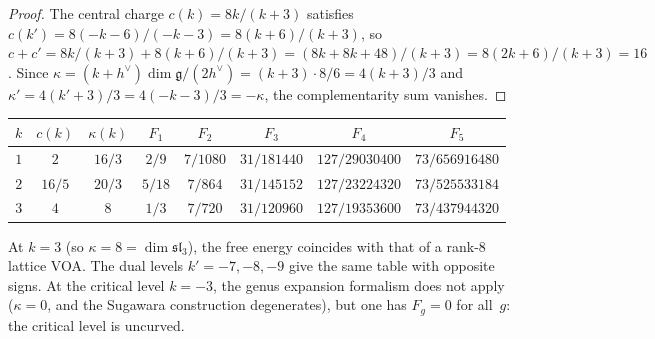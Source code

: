 \begin{proof}
The central charge $c(k) = 8k/(k+3)$ satisfies
$c(k') = 8(-k-6)/(-k-3) = 8(k+6)/(k+3)$, so
$c + c' = 8k/(k+3) + 8(k+6)/(k+3) = (8k + 8k + 48)/(k+3)
= 8(2k+6)/(k+3) = 16$.
Since $\kappa = (k+h^\vee)\dim\mathfrak{g}/(2h^\vee)
= (k+3) \cdot 8/6 = 4(k+3)/3$ and
$\kappa' = 4(k'+3)/3 = 4(-k-3)/3 = -\kappa$,
the complementarity sum vanishes.
\end{proof}

\begin{computation}\label{comp:sl3-multi-level}

\begin{center}
\renewcommand{\arraystretch}{1.3}
\begin{tabular}{cccccccc}
\toprule
$k$ & $c(k)$ & $\kappa(k)$ & $F_1$ & $F_2$ & $F_3$ & $F_4$ & $F_5$ \\
\midrule
$1$ & $2$ & $16/3$ & $2/9$ & $7/1080$ & $31/181440$ & $127/29030400$ & $73/656916480$ \\[3pt]
$2$ & $16/5$ & $20/3$ & $5/18$ & $7/864$ & $31/145152$ & $127/23224320$ & $73/525533184$ \\[3pt]
$3$ & $4$ & $8$ & $1/3$ & $7/720$ & $31/120960$ & $127/19353600$ & $73/437944320$ \\
\bottomrule
\end{tabular}
\end{center}

\noindent
At $k = 3$ (so $\kappa = 8 = \dim\mathfrak{sl}_3$), the free energy coincides
with that of a rank-$8$ lattice VOA. The dual levels
$k' = -7, -8, -9$ give the same table with opposite signs.
At the critical level $k = -3$, the genus expansion formalism
does not apply ($\kappa = 0$, and the Sugawara construction
degenerates), but one has $F_g = 0$ for all~$g$: the critical
level is uncurved.
\end{computation}

